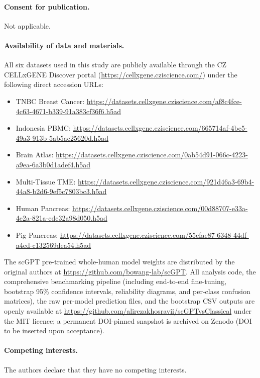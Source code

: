 \documentclass[11pt,a4paper]{article}
\begin{document}
\paragraph{Consent for publication.} Not applicable.

\paragraph{Availability of data and materials.} All six datasets used in this study are publicly available through the CZ CELLxGENE Discover portal (\url{https://cellxgene.cziscience.com/}) under the following direct accession URLs:
\begin{itemize}
    \item TNBC Breast Cancer: \url{https://datasets.cellxgene.cziscience.com/af8c4fce-4c63-4671-b339-91a383cf36f6.h5ad}
    \item Indonesia PBMC: \url{https://datasets.cellxgene.cziscience.com/665714af-4be5-49a3-913b-5ab5ac25620d.h5ad}
    \item Brain Atlas: \url{https://datasets.cellxgene.cziscience.com/0ab54d91-066c-4223-a9ea-6a3b0d1adef4.h5ad}
    \item Multi-Tissue TME: \url{https://datasets.cellxgene.cziscience.com/921d46a3-69b4-44a8-b2d6-9ef5c7803bc3.h5ad}
    \item Human Pancreas: \url{https://datasets.cellxgene.cziscience.com/00d88707-e33a-4c2a-821a-cdc32a98d050.h5ad}
    \item Pig Pancreas: \url{https://datasets.cellxgene.cziscience.com/55cfae87-6348-44df-a4ed-c132569dea54.h5ad}
\end{itemize}
The scGPT pre-trained whole-human model weights are distributed by the original authors at \url{https://github.com/bowang-lab/scGPT}. All analysis code, the comprehensive benchmarking pipeline (including end-to-end fine-tuning, bootstrap 95\% confidence intervals, reliability diagrams, and per-class confusion matrices), the raw per-model prediction files, and the bootstrap CSV outputs are openly available at \url{https://github.com/alirezakhosravii/scGPTvsClassical} under the MIT licence; a permanent DOI-pinned snapshot is archived on Zenodo (DOI to be inserted upon acceptance).

\paragraph{Competing interests.} The authors declare that they have no competing interests.
\end{document}
